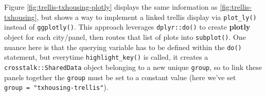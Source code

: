 \documentclass[
  12pt,
]{krantz}
\newenvironment{Shaded}{\begin{snugshade}}{\end{snugshade}}
\newcommand{\DataTypeTok}[1]{\textcolor[rgb]{0.13,0.29,0.53}{#1}}
\newcommand{\DecValTok}[1]{\textcolor[rgb]{0.00,0.00,0.81}{#1}}
\newcommand{\FloatTok}[1]{\textcolor[rgb]{0.00,0.00,0.81}{#1}}
\newcommand{\KeywordTok}[1]{\textcolor[rgb]{0.13,0.29,0.53}{\textbf{#1}}}
\newcommand{\NormalTok}[1]{#1}
\newcommand{\OperatorTok}[1]{\textcolor[rgb]{0.81,0.36,0.00}{\textbf{#1}}}
\newcommand{\OtherTok}[1]{\textcolor[rgb]{0.56,0.35,0.01}{#1}}
\newcommand{\StringTok}[1]{\textcolor[rgb]{0.31,0.60,0.02}{#1}}
\begin{document}
Figure \ref{fig:trellis-txhousing-plotly} displays the same information as \ref{fig:trellis-txhousing}, but shows a way to implement a linked trellis display via \texttt{plot\_ly()} instead of \texttt{ggplotly()}. This approach leverages \texttt{dplyr::do()} to create \textbf{plotly} object for each city/panel, then routes that list of plots into \texttt{subplot()}. One nuance here is that the querying variable has to be defined within the \texttt{do()} statement, but everytime \texttt{highlight\_key()} is called, it creates a \texttt{crosstalk::SharedData} object belonging to a new unique \texttt{group}, so to link these panels together the \texttt{group} must be set to a constant value (here we've set \texttt{group\ =\ "txhousing-trellis"}).

\begin{Shaded}
\end{Shaded}
\end{document}

